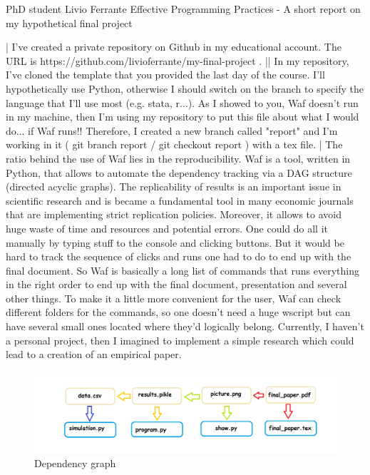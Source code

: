 \documentclass{article}
\begin{document}
PhD student Livio Ferrante
Effective Programming Practices - A short report on my hypothetical final project

|
I've created a private repository on Github in my educational account. The URL is https://github.com/livioferrante/my-final-project .
||
In my repository, I've cloned the template that you provided the last day of the course. I'll hypothetically use Python, otherwise I should switch on the branch to specify the language that I'll use most (e.g. stata, r...).
As I showed to you, Waf doesn't run in my machine, then I'm using my repository to put this file about what I would do... if Waf runs!! Therefore, I created a new branch called "report" and I'm working in it  ( git branch report   /   git checkout report ) with a tex file.
|
The ratio behind the use of Waf lies in the reproducibility. Waf is a tool, written in Python, that allows to automate the dependency tracking via a DAG structure (directed acyclic graphs). The replicability of results is an important issue in scientific research and is became a fundamental tool in many economic journals that are implementing strict replication policies. Moreover, it allows to avoid huge waste of time and resources and potential errors.
One could do all it manually by typing stuff to the console and clicking buttons. But it would be hard to track the sequence of clicks and runs one had to do to end up with the final document. So Waf is basically a long list of commands that runs everything in the right order to end up with the final document, presentation and several other things. To make it a little more convenient for the user, Waf can check different folders for the commands, so one doesn't need a huge wscript but can have several small ones located where they'd logically belong.
Currently, I haven't a personal project, then I imagined to implement a simple research which could lead to a creation of an empirical paper.

\begin{figure}[htbp] 
	\centering 
	\includegraphics[scale=0.4]
	{effective.png} 
	\caption{Dependency graph} 
	\label{fig:figuraSingola} 
\end{figure}
\end{document}
